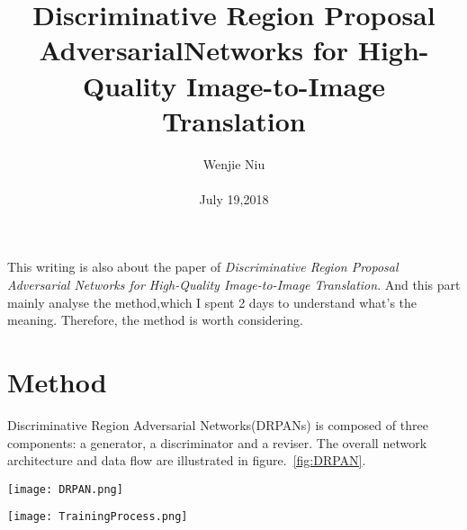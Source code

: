 \documentclass[10pt,twocolumn,letterpaper]{article}
\begin{document}
\title{Discriminative Region Proposal AdversarialNetworks for High-Quality Image-to-Image Translation}

\author{Wenjie Niu\\\\ July 19,2018}

\maketitle
This writing is also about the paper of \emph{Discriminative Region Proposal Adversarial Networks for High-Quality Image-to-Image Translation}. And this part mainly analyse the method,which I spent 2 days to understand what's the meaning. Therefore, the method is worth considering.
\section{Method}
 Discriminative Region Adversarial Networks(DRPANs) is composed of three components: a generator, a discriminator and a reviser.  The overall network architecture and data flow are illustrated in figure.~\ref{fig:DRPAN}.
 
 \begin{figure*}
 	\begin{center}
 		\texttt{[image: DRPAN.png]}
 	\end{center}
 	\caption{The overall network architecture and data flow of our proposed Discriminative Region Proposal Adversarial Network (DRPAN), which is composed of three components: a generator, a discriminator, and a reviser, and is a unified model for image-to-image translation tasks~\cite{Wang2017Discriminative}.}
 	\label{fig:DRPAN}
 \end{figure*}
 
  \begin{figure*}
  	\begin{center}
  		\texttt{[image: TrainingProcess.png]}
  	\end{center}
  	\caption{The training process of DRPAN on facades dataset~\cite{Radim2013Spatial}. Left: The plotting curve shows mean value of score map on synthesized samples. Right: Step by step synthesis on different discriminative regions~\cite{Wang2017Discriminative}.}
  	\label{fig:TrainingProcess}
  \end{figure*}
  
\end{document}
